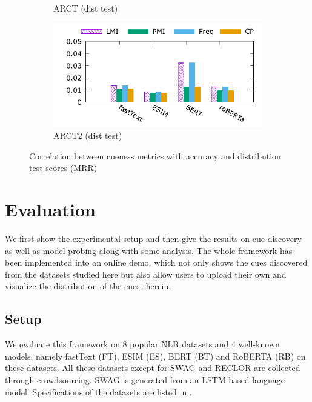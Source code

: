 \begin{figure}[th]
\begin{subfigure}[b]{0.24\textwidth}
\caption{ARCT (dist test)}
\label{fig:d_cue_arct}
\end{subfigure}
\hfill
\begin{subfigure}[b]{0.24\textwidth}
\centering
\includegraphics[width=\columnwidth]{data/dist_arct2.pdf}
\caption{ARCT2 (dist test)}
\label{fig:d_cue_arct2}
\end{subfigure}
\caption{Correlation between cueness metrics with accuracy and distribution test
scores (MRR)}
\label{fig:cue_result}
\end{figure}


\section{Evaluation}
\label{sec:eval}
We first show the experimental setup and then give the results
on cue discovery as well as model probing along with some analysis.
The whole framework has been implemented into an online demo, 
which not only shows the cues
discovered from the datasets studied here but also allow users to upload
their own and visualize the distribution of the cues therein.

\subsection{Setup} 
We evaluate this framework on 8 popular NLR datasets and
4 well-known models, namely fastText (FT), ESIM (ES), BERT (BT) and RoBERTA (RB)
on these datasets. All these datasets except for SWAG and RECLOR are collected
through crowdsourcing. SWAG is generated from an LSTM-based language model.
Specifications of the datasets are listed in .

